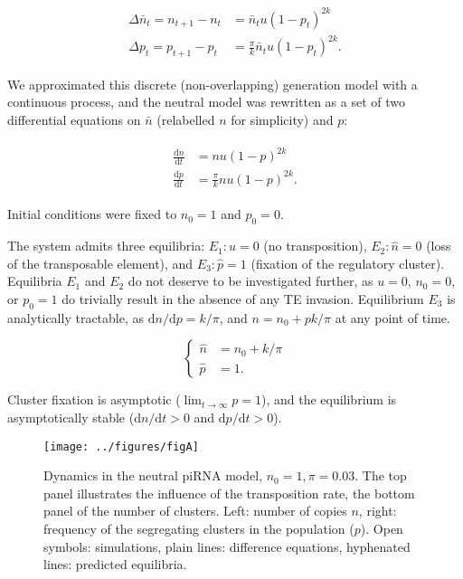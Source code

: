\documentclass[10pt,a4paper]{article}
\begin{document}
\begin{align}\label{eq:basic}
\begin{split}
\Delta \bar n_t = n_{t+1} - n_t &= \bar n_t u (1-p_t)^{2k} \\
\Delta p_t = p_{t+1} - p_t &= \frac{\pi}{k}  \bar n_t u (1-p_t)^{2k}.
\end{split}
\end{align}

We approximated this discrete (non-overlapping) generation model with a continuous process, and the neutral model was rewritten as a set of two differential equations on $\bar n$ (relabelled $n$ for simplicity) and $p$:

\begin{align}\label{eq:neutral}
\begin{split}
\frac{\mathrm d n}{\mathrm d t} &= n u (1-p)^{2k} \\
\frac{\mathrm d p}{\mathrm d t} &= \frac{\pi}{k} n u (1-p)^{2k}.
\end{split}
\end{align}

Initial conditions were fixed to $n_0 = 1$ and $p_0 = 0$. 

The system admits three equilibria: $E_1: u = 0$ (no transposition), $E_2: \hat n = 0$ (loss of the transposable element), and $E_3: \hat p = 1$ (fixation of the regulatory cluster). Equilibria $E_1$ and $E_2$ do not deserve to be investigated further, as $u=0$, $n_0=0$, or $p_0=1$ do trivially result in the absence of any TE invasion. Equilibrium $E_3$ is analytically tractable, as $\mathrm d n / \mathrm d p = k/\pi$, and $n = n_0 + pk/\pi$ at any point of time. 

\begin{equation}\label{eq:eqneutral}
\begin{cases}
\hat n &= n_0 + k/\pi \\
\hat p &= 1.
\end{cases}
\end{equation}

Cluster fixation is asymptotic ($\lim_{t \rightarrow \infty} p = 1$), and the equilibrium is asymptotically stable ($\mathrm d n /\mathrm d t > 0$ and $\mathrm d p/ \mathrm d t > 0$). 

\begin{figure}[h]
\begin{adjustwidth}{-1in}{0in}
\begin{flushright}
	\texttt{[image: ../figures/figA]}
\caption{\label{fig:figA} Dynamics in the neutral piRNA model, $n_0=1, \pi=0.03$. The top panel illustrates the influence of the transposition rate, the bottom panel of the number of clusters. Left: number of copies $n$, right: frequency of the segregating clusters in the population ($p$). Open symbols: simulations, plain lines: difference equations, hyphenated lines: predicted equilibria. }
\end{flushright}\end{adjustwidth}
\end{figure}
\end{document}
